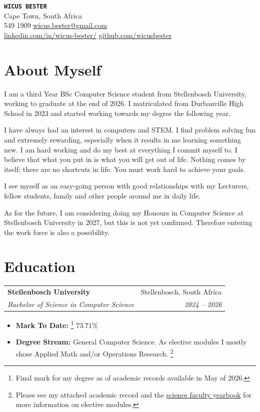 \documentclass[11pt,a4paper]{article}
\makeatletter
\newcommand{\cvEntry}[4]{
  \noindent\vspace{2pt}\begin{tabular*}{1\textwidth}[t]{l@{\extracolsep{\fill}}r}
    \textbf{#1} & #2 \\
    \textit{\small#3} & \textit{\small #4} \\
  \end{tabular*}\vspace{0pt}
}
\makeatother
\begin{document}
\begin{center}
    {\Huge \textbf{\texttt{WICUS BESTER}}} \\ \vspace{5pt}
    \faMapMarker* Cape Town, South Africa \\
     549 1909 \quad
    \faEnvelope \href{mailto:wicus.bester@gmail.com}{wicus.bester@gmail.com} \quad \\
    \faLinkedin \href{https://www.linkedin.com/in/wicus-bester/}{linkedin.com/in/wicus-bester/} \quad
    \faGithub \href{https://github.com/wicusbester}{github.com/wicusbester}
\end{center}

\section{About Myself}
I am a third Year BSc Computer Science student from Stellenbosch University,
working to graduate at the end of 2026. I matriculated from Durbanville High School in 2023
and started working towards my degree the following year.

I have always had an interest in computers and STEM. I find problem solving fun and extremely rewarding, especially when
it results in me learning something new. I am hard working and do my best at everything I commit myself to. I believe
that what you put in is what you will get out of life. Nothing comes by itself; there are no shortcuts in life.
You must work hard to achieve your goals.

I see myself as an easy-going person with good relationships with my Lecturers, fellow students, family
and other people around me in daily life.

As for the future, I am considering doing my Honours in Computer Science at Stellenbosch University in 2027, but
this is not yet confirmed. Therefore entering the work force is also a possibility.


\section{Education}
  \cvEntry
    {Stellenbosch University}{Stellenbosch, South Africa}
    {Bachelor of Science in Computer Science}{2024 -- 2026}
      \begin{itemize}[leftmargin=0.15in, label={}, noitemsep]
        \small
        \item \textbf{Mark To Date:}
          \footnote{Final mark for my degree as of academic records available in May of 2026.}
          $73.71\%$
        \item \textbf{Degree Stream:} General Computer Science. As elective modules I mostly
          chose Applied Math and/or Operations Research.
          \footnote{Please see my attached academic record and the
            \href{https://www.su.ac.za/en/about/governance/registrar/yearbooks}{science faculty yearbook}
            for more information on elective modules.}
      \end{itemize}
\end{document}
